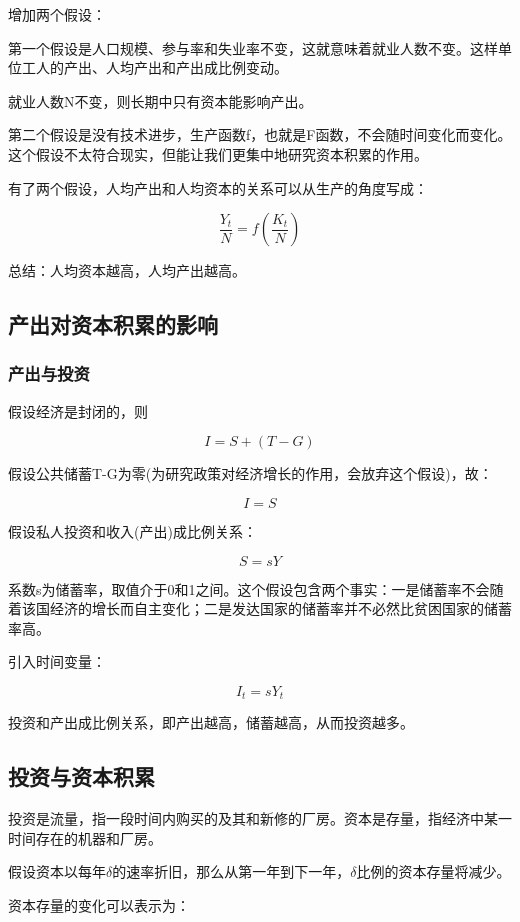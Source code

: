 \documentclass{article}
\begin{document}
增加两个假设：

第一个假设是人口规模、参与率和失业率不变，这就意味着就业人数不变。这样单位工人的产出、人均产出和产出成比例变动。

就业人数N不变，则长期中只有资本能影响产出。

第二个假设是没有技术进步，生产函数f，也就是F函数，不会随时间变化而变化。这个假设不太符合现实，但能让我们更集中地研究资本积累的作用。

\hspace*{\fill}

有了两个假设，人均产出和人均资本的关系可以从生产的角度写成：

\[
\frac{Y_t}{N}=f(\frac{K_t}{N})
\]

总结：人均资本越高，人均产出越高。

\subsection{产出对资本积累的影响}

\subsubsection{产出与投资}

假设经济是封闭的，则

\[
I=S+(T-G)
\]

假设公共储蓄T-G为零(为研究政策对经济增长的作用，会放弃这个假设)，故：

\[
I=S
\]

假设私人投资和收入(产出)成比例关系：

\[
S=sY
\]

系数s为储蓄率，取值介于0和1之间。这个假设包含两个事实：一是储蓄率不会随着该国经济的增长而自主变化；二是发达国家的储蓄率并不必然比贫困国家的储蓄率高。

引入时间变量：

\[
I_t=sY_t
\]

投资和产出成比例关系，即产出越高，储蓄越高，从而投资越多。

\subsection{投资与资本积累}

投资是流量，指一段时间内购买的及其和新修的厂房。资本是存量，指经济中某一时间存在的机器和厂房。

假设资本以每年$\delta$的速率折旧，那么从第一年到下一年，$\delta$比例的资本存量将减少。

资本存量的变化可以表示为：
\end{document}

